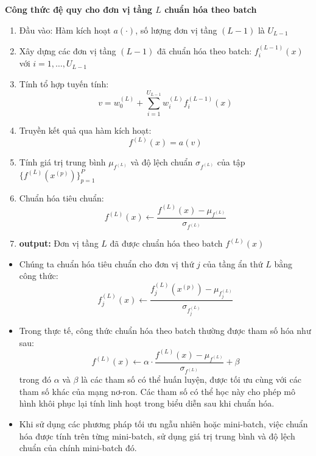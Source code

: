 \documentclass{book}
\begin{document}
    \textbf{Công thức đệ quy cho đơn vị tầng $L$ chuẩn hóa theo batch}
    \begin{enumerate}
        \item Đầu vào: Hàm kích hoạt $a(\cdot)$, số lượng đơn vị tầng $(L{-}1)$ là $U_{L-1}$
        
        \item Xây dựng các đơn vị tầng $(L{-}1)$ đã chuẩn hóa theo batch: $f^{(L-1)}_i(x)$ với $i = 1, \dots, U_{L-1}$
        
        \item Tính tổ hợp tuyến tính: 
        \[
        v = w^{(L)}_0 + \sum_{i=1}^{U_{L-1}} w^{(L)}_i f^{(L-1)}_i(x)
        \]
        
        \item Truyền kết quả qua hàm kích hoạt: 
        \[
        f^{(L)}(x) = a(v)
        \]
        
        \item Tính giá trị trung bình $\mu_{f^{(L)}}$ và độ lệch chuẩn $\sigma_{f^{(L)}}$ của tập $\{f^{(L)}(x^{(p)})\}_{p=1}^{P}$
        
        \item Chuẩn hóa tiêu chuẩn: 
        \[
        f^{(L)}(x) \leftarrow \frac{f^{(L)}(x) - \mu_{f^{(L)}}}{\sigma_{f^{(L)}}}
        \]
        
        \item \textbf{output:} Đơn vị tầng $L$ đã được chuẩn hóa theo batch $f^{(L)}(x)$
    \end{enumerate}

    \begin{itemize}
        \item Chúng ta chuẩn hóa tiêu chuẩn cho đơn vị thứ $j$ của tầng ẩn thứ $L$ bằng công thức:
        \[
        f^{(L)}_j(x) \leftarrow \frac{f^{(L)}_j(x^{(p)}) - \mu_{f^{(L)}_j}}{\sigma_{f^{(L)}_j}}
        \]
        \item Trong thực tế, công thức chuẩn hóa theo batch thường được tham số hóa như sau:
        \[
        f^{(L)}(x) \leftarrow \alpha \cdot \frac{f^{(L)}(x) - \mu_{f^{(L)}}}{\sigma_{f^{(L)}}} + \beta
        \]
        trong đó $\alpha$ và $\beta$ là các tham số có thể huấn luyện, được tối ưu cùng với các tham số khác của mạng nơ-ron. Các tham số có thể học này cho phép mô hình khôi phục lại tính linh hoạt trong biểu diễn sau khi chuẩn hóa.
        \item Khi sử dụng các phương pháp tối ưu ngẫu nhiên hoặc mini-batch, việc chuẩn hóa được tính trên từng mini-batch, sử dụng giá trị trung bình và độ lệch chuẩn của chính mini-batch đó.
    \end{itemize}
\end{document}
